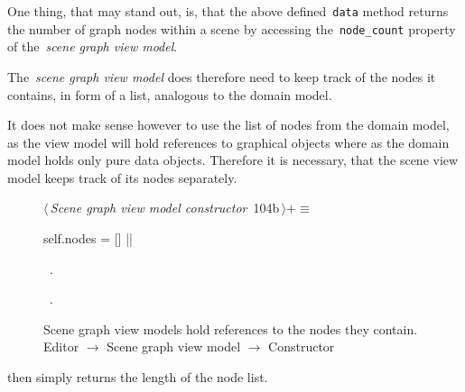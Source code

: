 \documentclass[%
    a4paper,    %
    justified,  %
    nobib,      %
    openany     %
]{tufte-book}
\makeatletter
\renewcommand{\label}[1]{\@tufte@label{##1}}%
\makeatother
\begin{document}
One thing, that may stand out, is, that the above defined~\verb=data= method
returns the number of graph nodes within a scene by accessing
the~\verb=node_count= property of the~\emph{scene graph view model}.

The~\emph{scene graph view model} does therefore need to keep track of the nodes it
contains, in form of a list, analogous to the domain model.

It does not make sense however to use the list of nodes from the domain model,
as the view model will hold references to graphical objects where as the domain
model holds only pure data objects. Therefore it is necessary, that the scene
view model keeps track of its nodes separately.

\begin{figure}[!htbp]
\begin{flushleft} \small
\begin{minipage}{\linewidth}\label{scrap36}\raggedright\small
{} $\langle\,${\itshape Scene graph view model constructor}\nobreak\ {\footnotesize {104b}}$\,\rangle+\equiv$
\vspace{-1ex}
\begin{pythoncode}
    self.nodes = []
|\NWsep|
\end{pythoncode}
\vspace{1.5ex}
\footnotesize
\begin{list}{}{\setlength{\itemsep}{-\parsep}\setlength{\itemindent}{-\leftmargin}}
\item \NWtxtMacroDefBy\ .
\item \NWtxtMacroRefIn\ .

\item{}
\end{list}
\end{minipage}\vspace{4ex}
\end{flushleft}
\caption{Scene graph view models hold references to the nodes they contain.
  \newline{}\newline{}Editor $\rightarrow$ Scene graph view model $\rightarrow$
  Constructor}
\end{figure}

 then simply returns the length of the node
list.
\end{document}
